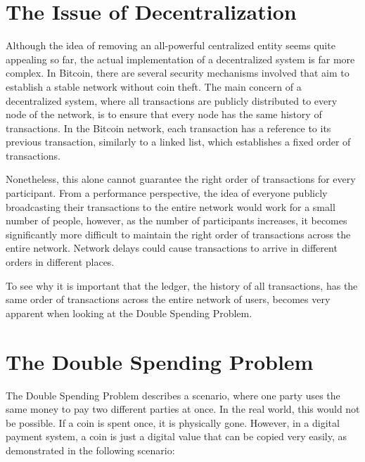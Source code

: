 \documentclass[a4paper, 12pt]{report}
\begin{document}
\section{The Issue of Decentralization}

\par Although the idea of removing an all-powerful centralized entity seems quite appealing so far, the actual implementation of a decentralized system is far more complex. In Bitcoin, there are several security mechanisms involved that aim to establish a stable network without coin theft. The main concern of a decentralized system, where all transactions are publicly distributed to every node of the network, is to ensure that every node has the same history of transactions. In the Bitcoin network, each transaction has a reference to its previous transaction, similarly to a linked list, which establishes a fixed order of transactions.

\par Nonetheless, this alone cannot guarantee the right order of transactions for every participant. From a performance perspective, the idea of everyone publicly broadcasting their transactions to the entire network would work for a small number of people, however, as the number of participants increases, it becomes significantly more difficult to maintain the right order of transactions across the entire network. Network delays could cause transactions to arrive in different orders in different places.

\par To see why it is important that the ledger, the history of all transactions, has the same order of transactions across the entire network of users, becomes very apparent when looking at the Double Spending Problem.

\section{The Double Spending Problem}

\par The Double Spending Problem describes a scenario, where one party uses the same money to pay two different parties at once. In the real world, this would not be possible. If a coin is spent once, it is physically gone. However, in a digital payment system, a coin is just a digital value that can be copied very easily, as demonstrated in the following scenario:
\end{document}
